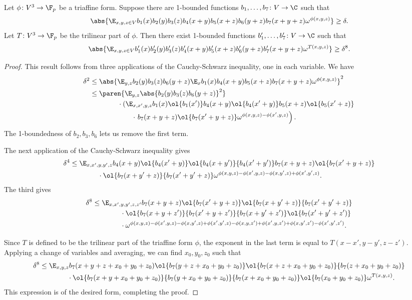 \begin{lemma}
\label{thm:multiaffine-cs}
Let $\phi\colon V^3\to\F_p$ be a triaffine form. Suppose there are 1-bounded functions $b_1,\ldots,b_7\colon V\to\C$ such that
\[\abs{\E_{x,y,z\in V}b_1(x)b_2(y)b_3(z)b_4(x+y)b_5(x+z)b_6(y+z)b_7(x+y+z)\omega^{\phi(x,y,z)}}\geq\delta.\]
Let $T\colon V^3\to\F_p$ be the trilinear part of $\phi$. Then there exist 1-bounded functions $b'_1,\ldots,b'_7\colon V\to\C$ such that
\[\abs{\E_{x,y,z\in V}b'_1(x)b'_2(y)b'_3(z)b'_4(x+y)b'_5(x+z)b'_6(y+z)b'_7(x+y+z)\omega^{T(x,y,z)}}\geq\delta^8.\]
\end{lemma}

\begin{proof}
This result follows from three applications of the Cauchy-Schwarz inequality, one in each variable. We have 
\begin{align*}
\delta^2
&\leq\abs{\E_{y,z}b_2(y)b_3(z)b_6(y+z)\E_x b_1(x)b_4(x+y)b_5(x+z)b_7(x+y+z)\omega^{\phi(x,y,z)}}^2\\
&\leq \paren{\E_{y,z}\abs{b_2(y)b_3(z)b_6(y+z)}^2}\\
&\qquad\qquad\cdot\left(\E_{x,x',y,z}b_1(x)\ol{b_1(x')}b_4(x+y)\ol{b_4(x'+y)}b_5(x+z)\ol{b_5(x'+z)}\right.\\
&\qquad\qquad\qquad\cdot\left.b_7(x+y+z)\ol{b_7(x'+y+z)}\omega^{\phi(x,y,z)-\phi(x',y,z)}\right).
\end{align*}
The 1-boundedness of $b_2,b_3,b_6$ lets us remove the first term. 

The next application of the Cauchy-Schwarz inequality gives
\begin{align*}
\delta^4
&\leq \E_{x,x',y,y',z}b_4(x+y)\ol{b_4(x'+y)}\ol{b_4(x+y')}{b_4(x'+y')}b_7(x+y+z)\ol{b_7(x'+y+z)}\\
&\qquad\qquad\cdot\ol{b_7(x+y'+z)}{b_7(x'+y'+z)}\omega^{\phi(x,y,z)-\phi(x',y,z)-\phi(x,y',z)+\phi(x',y',z)}.
\end{align*}
The third gives
\begin{align*}
\delta^8
&\leq \E_{x,x',y,y',z,z'}b_7(x+y+z)\ol{b_7(x'+y+z)}\ol{b_7(x+y'+z)}{b_7(x'+y'+z)}\\
&\qquad\qquad\cdot\ol{b_7(x+y+z')}{b_7(x'+y+z')}{b_7(x+y'+z')}\ol{b_7(x'+y'+z')}\\
&\qquad\qquad\cdot\omega^{\phi(x,y,z)-\phi(x',y,z)-\phi(x,y',z)+\phi(x',y',z)-\phi(x,y,z')+\phi(x',y,z')+\phi(x,y',z')-\phi(x',y',z')}.
\end{align*}

Since $T$ is defined to be the trilinear part of the triaffine form $\phi$, the exponent in the last term is equal to $T(x-x',y-y',z-z')$. Applying a change of variables and averaging, we can find $x_0,y_0,z_0$ such that
\begin{align*}
\delta^8
&\leq \E_{x,y,z}b_7(x+y+z+x_0+y_0+z_0)\ol{b_7(y+z+x_0+y_0+z_0)}\ol{b_7(x+z+x_0+y_0+z_0)}{b_7(z+x_0+y_0+z_0)}\\
&\qquad\qquad\cdot\ol{b_7(x+y+x_0+y_0+z_0)}{b_7(y+x_0+y_0+z_0)}{b_7(x+x_0+y_0+z_0)}\ol{b_7(x_0+y_0+z_0)}\omega^{T(x,y,z)}.
\end{align*}
This expression is of the desired form, completing the proof.
\end{proof}

